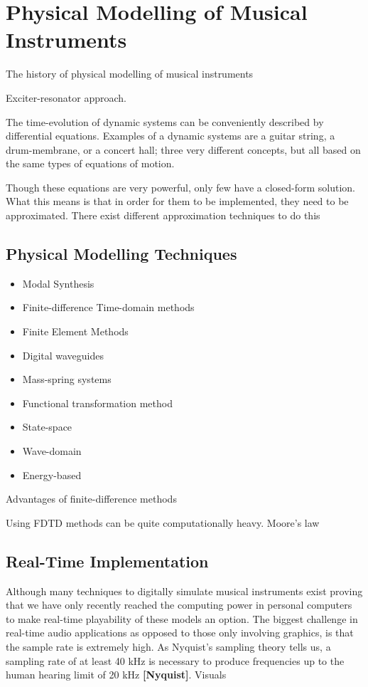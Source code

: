 \chapter{Physical Modelling of Musical Instruments}\label{ch:physMod}

The history of physical modelling of musical instruments

Exciter-resonator approach. 

The time-evolution of dynamic systems can be conveniently described by differential equations. Examples of a dynamic systems are a guitar string, a drum-membrane, or a concert hall; three very different concepts, but all based on the same types of equations of motion.

Though these equations are very powerful, only few have a closed-form solution. What this means is that in order for them to be implemented, they need to be approximated. There exist different approximation techniques to do this  

\section{Physical Modelling Techniques}\label{sec:physModTech}
\begin{itemize}
    \item Modal Synthesis
    \item Finite-difference Time-domain methods
    \item Finite Element Methods
    \item Digital waveguides
    \item Mass-spring systems
    \item Functional transformation method
    \item State-space
    \item Wave-domain
    \item Energy-based
\end{itemize}
    

Advantages of finite-difference methods

Using FDTD methods can be quite computationally heavy. 
Moore's law \cite{Moore1965}

\section{Real-Time Implementation}
Although many techniques to digitally simulate musical instruments exist
proving that we have only recently reached the computing power in personal computers to make real-time playability of these models an option. The biggest challenge in real-time audio applications as opposed to those only involving graphics, is that the sample rate is extremely high. As Nyquist's sampling theory tells us, a sampling rate of at least 40 kHz is necessary to produce frequencies up to the human hearing limit of 20 kHz \textbf{[Nyquist]}. Visuals 

